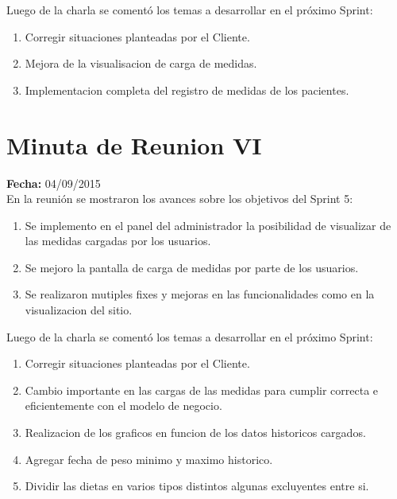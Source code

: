 \documentclass[runningheads,a4paper,spanish]{llncs}
\begin{document}
\begin{flushleft}
Luego de la charla se comentó los temas a desarrollar en el próximo Sprint:
\end{flushleft}

\begin{enumerate}
	\item Corregir situaciones planteadas por el Cliente. 
	\item Mejora de la visualisacion de  carga de medidas.
	\item Implementacion completa del registro de medidas de los pacientes. 
\end{enumerate}

\section{Minuta de Reunion VI}

\textbf{Fecha: }04/09/2015\\

En la reunión se mostraron los avances sobre los objetivos del Sprint 5:
\begin{enumerate}
\item Se implemento en el panel del administrador la posibilidad de visualizar de las medidas cargadas por los usuarios.
\item Se mejoro la pantalla de carga de medidas por parte de los usuarios.
\item Se realizaron mutiples fixes y mejoras en las funcionalidades como en la visualizacion del sitio.
\end{enumerate}

\begin{flushleft}
Luego de la charla se comentó los temas a desarrollar en el próximo Sprint:
\end{flushleft}

\begin{enumerate}
	\item Corregir situaciones planteadas por el Cliente. 
	\item Cambio importante en las cargas de las medidas para cumplir correcta e eficientemente con el modelo de negocio.
	\item Realizacion de los graficos en funcion de los datos historicos cargados.
	\item Agregar fecha de peso minimo y maximo historico.
	\item Dividir las dietas en varios tipos distintos algunas excluyentes entre si.
\end{enumerate}
\end{document}
